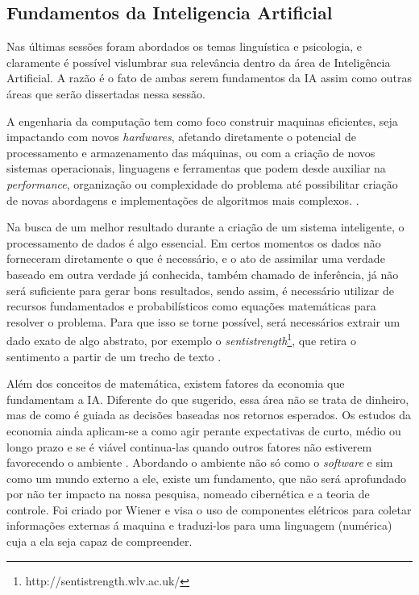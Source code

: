 \subsection{Fundamentos da Inteligencia Artificial}
Nas últimas sessões foram abordados os temas linguística e psicologia, e claramente é possível vislumbrar sua relevância dentro da área de Inteligência Artificial. A razão é o fato de ambas serem fundamentos da IA assim como outras áreas que serão dissertadas nessa sessão.

A engenharia da computação tem como foco construir maquinas eficientes, seja impactando com novos \textit{hardwares}, afetando diretamente o potencial de processamento e armazenamento das máquinas, ou com a criação de novos sistemas operacionais, linguagens e ferramentas que podem desde auxiliar na \textit{performance}, organização ou complexidade do problema até possibilitar criação de novas abordagens e implementações de algoritmos mais complexos. \cite[13-14]{russell2003artificial}.

Na busca de um melhor resultado durante a criação de um sistema inteligente, o processamento de dados é algo essencial. Em certos momentos os dados não forneceram diretamente o que é necessário, e o ato de assimilar uma verdade baseado em outra verdade já conhecida, também chamado de inferência, já não será suficiente para gerar bons resultados, sendo assim, é necessário utilizar de recursos fundamentados e probabilísticos como equações matemáticas para resolver o problema. Para que isso se torne possível, será necessários extrair um dado exato de algo abstrato, por exemplo o \textit{sentistrength}\footnote{http://sentistrength.wlv.ac.uk/}, que retira o sentimento a partir de um trecho de texto \cite{boole1854investigation}.

Além dos conceitos de matemática, existem fatores da economia que fundamentam a IA. Diferente do que sugerido, essa área não se trata de dinheiro, mas de como é guiada as decisões baseadas nos retornos esperados. Os estudos da economia ainda aplicam-se a como agir perante expectativas de curto, médio ou longo prazo e se é viável continua-las quando outros fatores não estiverem favorecendo o ambiente \cite[9]{russell2003artificial}. Abordando o ambiente não só como o \textit{software} e sim como um mundo externo a ele, existe um fundamento, que não será aprofundado por não ter impacto na nossa pesquisa, nomeado cibernética e a teoria de controle. Foi criado por Wiener\cite{wiener1961cybernetics} e visa o uso de componentes elétricos para coletar informações externas á maquina e traduzi-los para uma linguagem (numérica) cuja a ela seja capaz de compreender.

